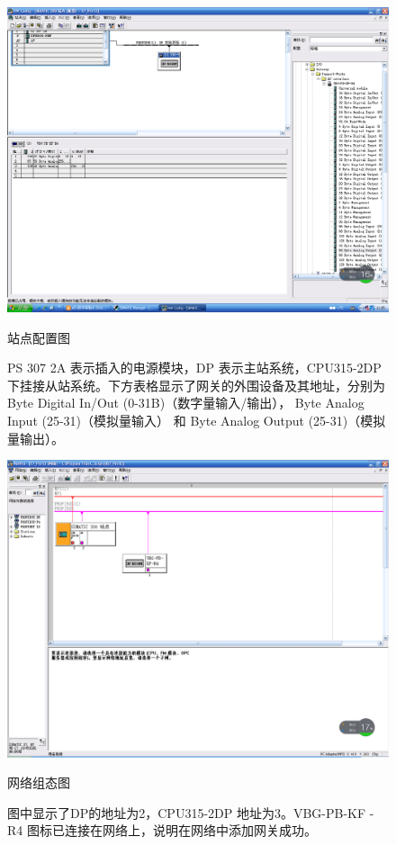 \begin{figure}[htbp]
\centering
\includegraphics[width=12cm]{resource/hard_config.png}
\caption{站点配置图}
\caption*{\small{\ttfamily PS 307 2A} 表示插入的电源模块，{\ttfamily DP} 表示主站系统，{\ttfamily CPU315-2DP} 下挂接从站系统。下方表格显示了网关的外围设备及其地址，分别为{ Byte Digital In/Out (0-31B)}（数字量输入/输出），{ Byte Analog Input (25-31)}（模拟量输入） 和 { Byte Analog Output (25-31)}（模拟量输出）。}
\label{fig:hard_conf}
\end{figure}

\begin{figure}[htbp]
\centering
\includegraphics[width=12cm]{resource/net_organize.png}
\caption{网络组态图}
\caption*{\small 图中显示了{\ttfamily DP}的地址为2，{\ttfamily CPU315-2DP} 地址为3。{\ttfamily VBG-PB-KF -R4} 图标已连接在网络上，说明在网络中添加网关成功。}
\label{fig:net_org}
\end{figure}


